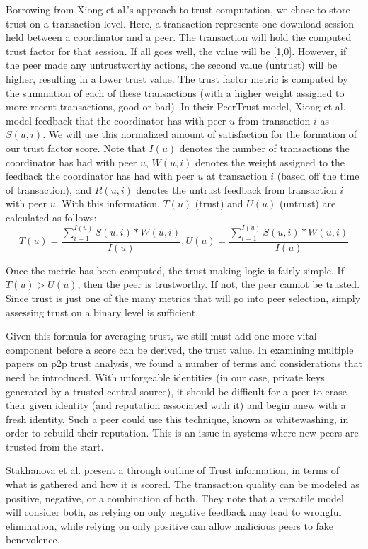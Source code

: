 \documentclass[12pt]{article}
\begin{document}
			Borrowing from Xiong et al.'s approach to trust computation, we chose to store trust on a transaction level. Here, a transaction represents one download session held between a coordinator and a peer. The transaction will hold the computed trust factor for that session. If all goes well, the value will be [1,0]. However, if the peer made any untrustworthy actions, the second value (untrust) will be higher, resulting in a lower trust value. The trust factor metric is computed by the summation of each of these transactions (with a higher weight assigned to more recent transactions, good or bad). In their PeerTrust model, Xiong et al. model feedback that the coordinator has with peer $u$ from transaction $i$ as $S(u,i)$. We will use this normalized amount of satisfaction for the formation of our trust factor score. Note that $I(u)$ denotes the number of transactions the coordinator has had with peer $u$, $W(u,i)$ denotes the weight assigned to the feedback the coordinator has had with peer $u$ at transaction $i$ (based off the time of transaction), and $R(u,i)$ denotes the untrust feedback from transaction $i$ with peer $u$. With this information, $T(u)$ (trust) and $U(u)$ (untrust) are calculated as follows:
			$$
				T(u) = \frac{\sum\limits_{i=1}^{I(u)} S(u,i) * W(u,i)}{I(u)},
				U(u) = \frac{\sum\limits_{i=1}^{I(u)} S(u,i) * W(u,i)}{I(u)}
			$$

			Once the metric has been computed, the trust making logic is fairly simple. If $T(u) > U(u)$, then the peer is trustworthy. If not, the peer cannot be trusted. Since trust is just one of the many metrics that will go into peer selection, simply assessing trust on a binary level is sufficient. 

			Given this formula for averaging trust, we still must add one more vital component before a score can be derived, the trust value. In examining multiple papers on p2p trust analysis, we found a number of terms and considerations that need be introduced. With unforgeable identities (in our case, private keys generated by a trusted central source), it should be difficult for a peer to erase their given identity (and reputation associated with it) and begin anew with a fresh identity. Such a peer could use this technique, known as whitewashing, in order to rebuild their reputation. This is an issue in systems where new peers are trusted from the start.

			Stakhanova et al. present a through outline of Trust information, in terms of what is gathered and how it is scored. The transaction quality can be modeled as positive, negative, or a combination of both. They note that a versatile model will consider both, as relying on only negative feedback may lead to wrongful elimination, while relying on only positive can allow malicious peers to fake benevolence\cite{stakhanova2004reputation}.
\end{document}
